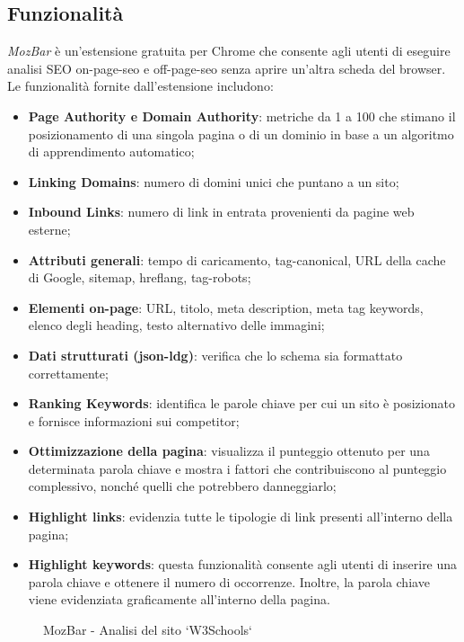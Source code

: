 \subsection{Funzionalità}
\par \textit{MozBar} è un'estensione gratuita per Chrome che consente agli utenti di eseguire analisi SEO \gls{on-page-seo} e \gls{off-page-seo} senza aprire un'altra scheda del browser. Le funzionalità fornite dall'estensione includono:
\begin{itemize}
    \item \textbf{Page Authority e Domain Authority}: metriche da 1 a 100 che stimano il posizionamento di una singola pagina o di un dominio in base a un algoritmo di apprendimento automatico;
    \item \textbf{Linking Domains}: numero di domini unici che puntano a un sito;
    \item \textbf{Inbound Links}: numero di link in entrata provenienti da pagine web esterne;
    \item \textbf{Attributi generali}: tempo di caricamento, \gls{tag-canonical}, URL della cache di Google, \gls{sitemap}, \gls{hreflang}, \gls{tag-robots};
    \item \textbf{Elementi on-page}: URL, titolo, meta description, meta tag keywords, elenco degli heading, testo alternativo delle immagini;
    \item \textbf{Dati strutturati (\gls{json-ldg})}: verifica che lo schema sia formattato correttamente;
    \item \textbf{Ranking Keywords}: identifica le parole chiave per cui un sito è posizionato e fornisce informazioni sui competitor;
    \item \textbf{Ottimizzazione della pagina}: visualizza il punteggio ottenuto per una determinata parola chiave e mostra  i fattori che contribuiscono al punteggio complessivo, nonché quelli che potrebbero danneggiarlo;
    \item \textbf{Highlight links}: evidenzia tutte le tipologie di link presenti all'interno della pagina;
    \item \textbf{Highlight keywords}: questa funzionalità consente agli utenti di inserire una parola chiave e ottenere il numero di occorrenze. Inoltre, la parola chiave viene evidenziata graficamente all'interno della pagina.
\end{itemize}

\begin{figure}[H]
    \centering 
    \caption{MozBar - Analisi del sito `W3Schools`}
\end{figure}

